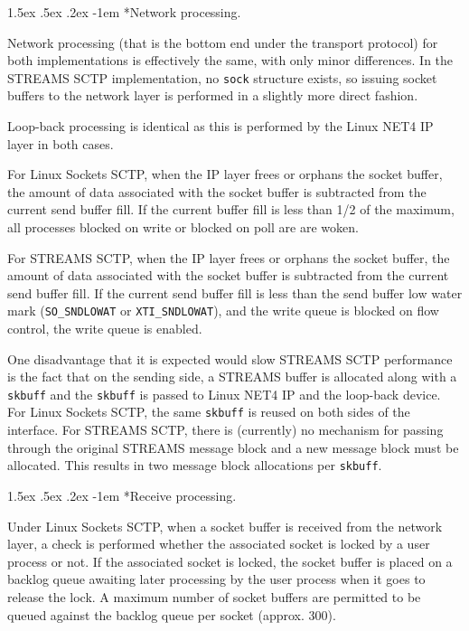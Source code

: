 \documentclass[letterpaper,final,notitlepage,twocolumn,10pt,twoside]{article}
\makeatletter
\renewcommand\paragraph{\@startsection{paragraph}{4}{\z@}%
                                    {1.5ex \@plus .5ex \@minus .2ex}%
                                    {-1em}%
                                    {\normalfont\normalsize\bfseries\slshape}}
\makeatother
\begin{document}
\paragraph*{Network processing.}

Network processing (that is the bottom end under the transport protocol) for
both implementations is effectively the same, with only minor differences.  In
the STREAMS SCTP implementation, no \texttt{sock} structure exists, so issuing
socket buffers to the network layer is performed in a slightly more direct
fashion.

Loop-back processing is identical as this is performed by the Linux NET4 IP
layer in both cases.

For Linux Sockets SCTP, when the IP layer frees or orphans the socket buffer, the
amount of data associated with the socket buffer is subtracted from the
current send buffer fill.  If the current buffer fill is less than 1/2 of the
maximum, all processes blocked on write or blocked on poll are are woken.

For STREAMS SCTP, when the IP layer frees or orphans the socket buffer, the
amount of data associated with the socket buffer is subtracted from the
current send buffer fill.  If the current send buffer fill is less than the
send buffer low water mark (\texttt{SO\_SNDLOWAT} or \texttt{XTI\_SNDLOWAT}),
and the write queue is blocked on flow control, the write queue is enabled.

One disadvantage that it is expected would slow STREAMS SCTP performance is the
fact that on the sending side, a STREAMS buffer is allocated along with a
\texttt{skbuff} and the \texttt{skbuff} is passed to Linux NET4 IP and the
loop-back device.  For Linux Sockets SCTP, the same \texttt{skbuff} is reused on
both sides of the interface.  For STREAMS SCTP, there is (currently) no
mechanism for passing through the original STREAMS message block and a new
message block must be allocated.  This results in two message block
allocations per \texttt{skbuff}.

\paragraph*{Receive processing.}

Under Linux Sockets SCTP, when a socket buffer is received from the network layer,
a check is performed whether the associated socket is locked by a user process
or not.  If the associated socket is locked, the socket buffer is placed on a
backlog queue awaiting later processing by the user process when it goes to
release the lock.  A maximum number of socket buffers are permitted to be
queued against the backlog queue per socket (approx. 300).
\end{document}
